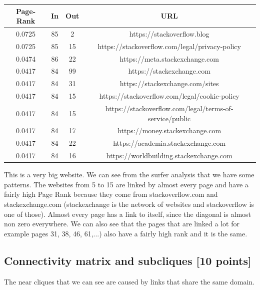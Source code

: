 \documentclass[unicode,11pt,a4paper,oneside,numbers=endperiod,openany]{scrartcl}
\begin{document}
\begin{itemize}
\begin{center}
 \begin{tabular}{||c | c | c | c||} 
 \hline
 Page-Rank & In & Out & URL \\ [0.5ex] 
 \hline\hline
 0.0725 & 85 & 2 & https://stackoverflow.blog \\ 
 \hline
 0.0725 & 85 & 15 & https://stackoverflow.com/legal/privacy-policy \\
 \hline
 0.0474 & 86 & 22 & https://meta.stackexchange.com \\
 \hline
 0.0417 & 84 & 99 & https://stackexchange.com \\
 \hline
 0.0417 & 84 & 31 & https://stackexchange.com/sites \\
 \hline
 0.0417 & 84 & 15 & https://stackoverflow.com/legal/cookie-policy \\
 \hline
 0.0417 & 84 & 15 & https://stackoverflow.com/legal/terms-of-service/public \\
 \hline
 0.0417 & 84 & 17 & https://money.stackexchange.com \\
 \hline
 0.0417 & 84 & 22 & https://academia.stackexchange.com \\
 \hline
 0.0417 & 84 & 16 & https://worldbuilding.stackexchange.com \\
 \hline
\end{tabular}
\end{center}

This is a very big website. We can see from the surfer analysis that we have some patterns. The websites from 5 to 15 are linked by almost every page and have a fairly high Page Rank because they come from stackoverflow.com and stackexchange.com (stackexchange is the network of websites and stackoverflow is one of those). Almost every
page has a link to itself, since the diagonal is almost non zero everywhere. We can also see that the pages that are linked a lot for example pages 31, 38, 46, 61,...) also have a fairly high rank and it is the same.
 
\end{itemize}

\newpage

\subsection{Connectivity matrix and subcliques [10 points]}
The near cliques that we can see are caused by links that share the same domain.
\end{document}
